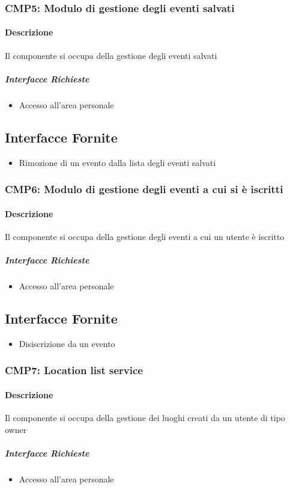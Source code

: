 \documentclass[9pt]{extarticle}
\begin{document}
\subsubsection*{CMP5: Modulo di gestione degli eventi salvati}
\paragraph{Descrizione}
Il componente si occupa della gestione degli eventi salvati
\subparagraph{Interfacce Richieste}
\begin{itemize}
	\item Accesso all'area personale
\end{itemize}
\subsection{Interfacce Fornite}
\begin{itemize}
	\item Rimozione di un evento dalla lista degli eventi salvati
\end{itemize}

\subsubsection*{CMP6: Modulo di gestione degli eventi a cui si è iscritti}
\paragraph{Descrizione}
Il componente si occupa della gestione degli eventi a cui un utente è iscritto
\subparagraph{Interfacce Richieste}
\begin{itemize}
	\item Accesso all'area personale
\end{itemize}
\subsection{Interfacce Fornite}
\begin{itemize}
	\item Disiscrizione da un evento
\end{itemize}

\subsubsection*{CMP7: Location list service}
\paragraph{Descrizione}
Il componente si occupa della gestione dei luoghi creati da un utente di tipo owner
\subparagraph{Interfacce Richieste}
\begin{itemize}
	\item Accesso all'area personale
\end{itemize}
\end{document}
